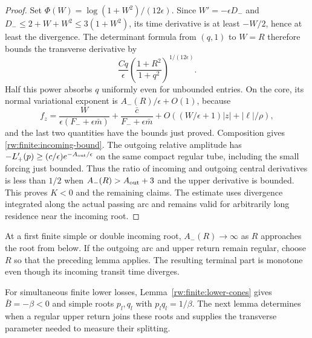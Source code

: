\begin{proof}
Set $\Phi(W)=\log(1+W^2)/(12\epsilon)$.
Since $W'=-\epsilon D_-$ and
$D_-\le2+W+W^2\le3(1+W^2)$, its time derivative is at least
$-W/2$, hence at least the divergence. The determinant formula
from $(q,1)$ to $W=R$ therefore bounds the transverse derivative
by
\[
 \frac{Cq}{\epsilon}
      \left(\frac{1+R^2}{1+q^2}\right)^{1/(12\epsilon)}.
\]
Half this power absorbs $q$ uniformly even for unbounded entries.
On the core, its normal variational exponent is
$A_-(R)/\epsilon+O(1)$, because
\[
 f_z=\frac{W}{\epsilon(F_-+\epsilon\bar m)}
       +\frac{\bar c}{F_-+\epsilon\bar m}
       +O((W/\epsilon+1)|z|+|\ell|/\rho),
\]
and the last two quantities have the bounds just proved.
Composition gives \eqref{rw:finite:incoming-bound}.
The outgoing relative amplitude has
$-L_+'(p)\ge(c/\epsilon)e^{-A_{\rm out}/\epsilon}$ on the
same compact regular tube, including the small forcing just bounded.
Thus the ratio of incoming and outgoing central derivatives is
less than $1/2$ when $A_-(R)>A_{\rm out}+3$ and the upper
derivative is bounded. This proves $K<0$ and the remaining claims.
The estimate uses divergence integrated along the actual passing arc
and remains valid for arbitrarily long residence near the incoming root.
\end{proof}

At a first finite simple or double incoming root, $A_-(R)\to\infty$
as $R$ approaches the root from below. If the outgoing arc and upper
return remain regular, choose $R$ so that the preceding lemma applies.
The resulting terminal part is monotone even though its incoming
transit time diverges.

For simultaneous finite lower losses,
Lemma~\ref{rw:finite:lower-cones} gives $\bar B=-\beta<0$ and
simple roots $p_l,q_l$ with $p_lq_l=1/\beta$. The next lemma
determines when a regular upper return joins these roots and supplies
the transverse parameter needed to measure their splitting.

